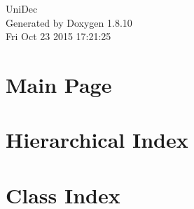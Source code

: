 \documentclass[twoside]{book}
\newcommand{\+}{\discretionary{\mbox{\scriptsize$\hookleftarrow$}}{}{}}
\newcommand{\clearemptydoublepage}{%
  \newpage{\pagestyle{empty}\cleardoublepage}%
}
\begin{document}
\hypersetup{pageanchor=false,
             bookmarks=true,
             bookmarksnumbered=true,
             pdfencoding=unicode
            }
\begin{titlepage}
\vspace*{7cm}
\begin{center}%
{\Large Uni\+Dec }\\
\vspace*{1cm}
{\large Generated by Doxygen 1.8.10}\\
\vspace*{0.5cm}
{\small Fri Oct 23 2015 17:21:25}\\
\end{center}
\end{titlepage}
\clearemptydoublepage
\tableofcontents
\clearemptydoublepage
{}
\hypersetup{pageanchor=true}

\chapter{Main Page}
\label{index}\hypertarget{index}{}
\chapter{Hierarchical Index}

\chapter{Class Index}

\end{document}
